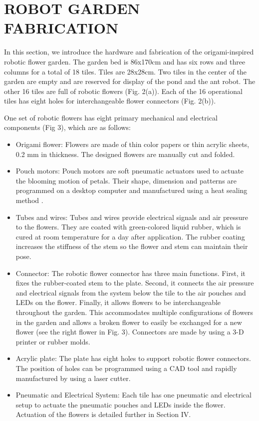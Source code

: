 \documentclass[letterpaper, 10 pt, conference]{ieeeconf}  %
\begin{document}
\section{ROBOT GARDEN FABRICATION}
In this section, we introduce the hardware and fabrication of the origami-inspired robotic flower garden. The garden bed is 86x170cm and has six rows and three columns for a total of 18 tiles.  Tiles are 28x28cm. Two tiles in the center of the garden are empty and are reserved for display of the pond and the ant robot.  The other 16 tiles are full of robotic flowers (Fig. 2(a)). Each of the 16 operational tiles has eight holes for interchangeable flower connectors (Fig. 2(b)).

One set of robotic flowers has eight primary mechanical and electrical components (Fig 3), which are as follows:

\begin{itemize}
	\item Origami flower: Flowers are made of thin color papers or thin acrylic sheets, 0.2 mm in thickness. The designed flowers are manually cut and folded.
	\item Pouch motors: Pouch motors are soft pneumatic actuators used to actuate the blooming motion of petals. Their shape, dimension and patterns are programmed on a desktop computer and manufactured using a heat sealing method \cite{NiiyamaICRA2014}.
	\item Tubes and wires: Tubes and wires provide electrical signals and air pressure to the flowers. They are coated with green-colored liquid rubber, which is cured at room temperature for a day after application. The rubber coating increases the stiffness of the stem so the flower and stem can maintain their pose. 
	\item Connector: The robotic flower connector has three main functions. First, it fixes the rubber-coated stem to the plate. Second, it connects the air pressure and electrical signals from the system below the tile to the air pouches and LEDs on the flower. Finally, it allows flowers to be interchangeable throughout the garden. This accommodates multiple configurations of flowers in the garden and allows a broken flower to easily be exchanged for a new flower (see the right flower in Fig. 3). Connectors are made by using a 3-D printer or rubber molds.  
	\item Acrylic plate: The plate has eight holes to support robotic flower connectors. The position of holes can be programmed using a CAD tool and rapidly manufactured by using a laser cutter.
	\item Pneumatic and Electrical System: Each tile has one pneumatic and electrical setup to actuate the pneumatic pouches and LEDs inside the flower. Actuation of the flowers is detailed further in Section IV. 
\end{itemize}
\end{document}
